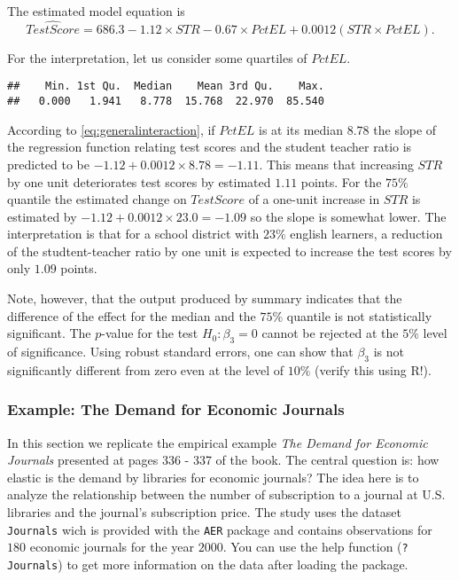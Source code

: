\documentclass[]{book}
\newenvironment{Shaded}{\begin{snugshade}}{\end{snugshade}}
\newcommand{\KeywordTok}[1]{\textcolor[rgb]{0.13,0.29,0.53}{\textbf{#1}}}
\newcommand{\OperatorTok}[1]{\textcolor[rgb]{0.81,0.36,0.00}{\textbf{#1}}}
\newcommand{\NormalTok}[1]{#1}
\theoremstyle{definition}
\theoremstyle{definition}
\theoremstyle{definition}
\theoremstyle{remark}
\begin{document}
The estimated model equation is
\[ \widehat{TestScore} = 686.3 - 1.12 \times STR - 0.67 \times PctEL + 0.0012(STR\times PctEL). \]

For the interpretation, let us consider some quartiles of \(PctEL\).

\begin{Shaded}
\end{Shaded}

\begin{verbatim}
##    Min. 1st Qu.  Median    Mean 3rd Qu.    Max. 
##   0.000   1.941   8.778  15.768  22.970  85.540
\end{verbatim}

According to \eqref{eq:generalinteraction}, if \(PctEL\) is at its median
\(8.78\) the slope of the regression function relating test scores and
the student teacher ratio is predicted to be
\(-1.12 + 0.0012 \times 8.78 = -1.11\). This means that increasing
\(STR\) by one unit deteriorates test scores by estimated \(1.11\)
points. For the \(75\%\) quantile the estimated change on \(TestScore\)
of a one-unit increase in \(STR\) is estimated by
\(-1.12 + 0.0012 \times 23.0 = -1.09\) so the slope is somewhat lower.
The interpretation is that for a school district with \(23\%\) english
learners, a reduction of the studtent-teacher ratio by one unit is
expected to increase the test scores by only \(1.09\) points.

Note, however, that the output produced by summary indicates that the
difference of the effect for the median and the \(75\%\) quantile is not
statistically significant. The \(p\)-value for the test
\(H_0: \beta_3 = 0\) cannot be rejected at the \(5\%\) level of
significance. Using robust standard errors, one can show that
\(\beta_3\) is not significantly different from zero even at the level
of \(10\%\) (verify this using R!).

\subsubsection*{Example: The Demand for Economic
Journals}\label{example-the-demand-for-economic-journals}

In this section we replicate the empirical example
\textit{The Demand for Economic Journals} presented at pages 336 - 337
of the book. The central question is: how elastic is the demand by
libraries for economic journals? The idea here is to analyze the
relationship between the number of subscription to a journal at U.S.
libraries and the journal's subscription price. The study uses the
dataset \texttt{Journals} wich is provided with the \texttt{AER} package
and contains observations for \(180\) economic journals for the year
\(2000\). You can use the help function (\texttt{?Journals}) to get more
information on the data after loading the package.
\end{document}
